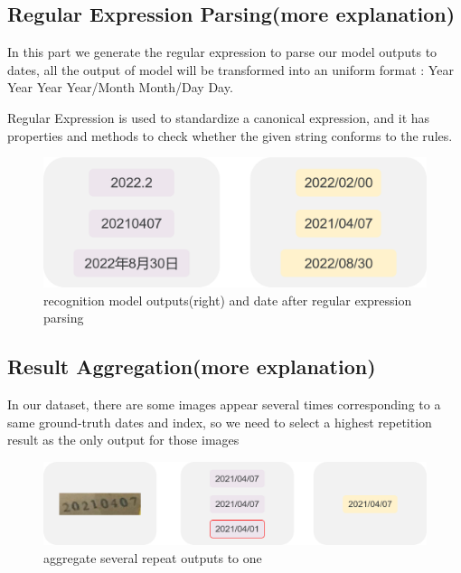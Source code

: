 \documentclass{article}
\begin{document}
\subsection{Regular Expression Parsing(more explanation)}

In this part we generate the regular expression to parse our model outputs to dates, all the output of model will be transformed into an uniform format : Year Year Year Year/Month Month/Day Day.

Regular Expression is  used to standardize a canonical expression, and it has properties and methods to check whether the given string conforms to the rules.\par

\begin{figure}[ht] \centering    
	\label{parsing}     
	\includegraphics[width=0.8\columnwidth]{parsing.png}  
   
	\caption{recognition model outputs(right) and date after regular expression parsing}
\end{figure}

\subsection{Result Aggregation(more explanation)}

In our dataset, there are some images appear several times corresponding to a same ground-truth dates and index, so we need to select a highest repetition result as the only output for those images

\begin{figure}[ht] \centering    
	\label{aggregation}     
	\includegraphics[width=0.8\columnwidth]{aggre.png}  
   
	\caption{aggregate several repeat outputs to one}
\end{figure}
\end{document}
